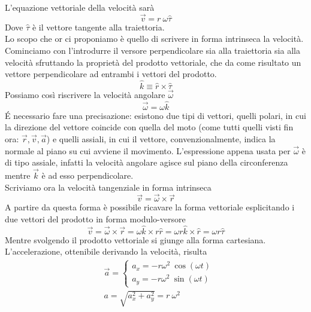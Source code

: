 \documentclass[10pt,a4paper]{article}
\begin{document}
L'equazione vettoriale della velocità  sarà
\begin{equation*}
\vec{v} = r\ \omega \hat{\tau}
\end{equation*}
Dove $\hat{\tau}$ è il vettore tangente alla traiettoria.\\
Lo scopo che or ci proponiamo è quello di scrivere in forma intrinseca la velocità. Cominciamo con l'introdurre il versore perpendicolare sia alla traiettoria sia alla velocità sfruttando la proprietà del prodotto vettoriale, che da come risultato un vettore perpendicolare ad entrambi i vettori del prodotto.
\begin{equation*}
	\hat{k} \equiv \hat{r} \times \hat{\tau}
\end{equation*}
Possiamo così riscrivere la velocità angolare $\vec{\omega}$
\begin{equation*}
	\vec{\omega} = \omega \hat{k}
\end{equation*}
\'{E} necessario fare una precisazione: esistono due tipi di vettori, quelli polari, in cui la direzione del vettore coincide con quella del moto (come tutti quelli visti fin ora: $\vec{r}, \vec{v}, \vec{a}$) e quelli assiali, in cui il vettore, convenzionalmente, indica la normale al piano su cui avviene il movimento. L'espressione appena usata per $\vec{\omega}$ è di tipo assiale, infatti la velocità angolare agisce sul piano della circonferenza mentre $\vec{k}$ è ad esso perpendicolare.\\
Scriviamo ora la velocità tangenziale in forma intrinseca
 \begin{equation*}
 	\vec{v} = \vec{\omega} \times \vec{r}
 \end{equation*}
A partire da questa forma è possibile ricavare la forma vettoriale esplicitando i due vettori del prodotto in forma modulo-versore
 \begin{equation*}
	\vec{v} = \vec{\omega} \times \vec{r} = \omega \hat{k} \times r \hat{r} = \omega r \hat{k} \times \hat{r} = \omega r \hat{\tau}
\end{equation*}
Mentre svolgendo il prodotto vettoriale si giunge alla forma cartesiana. \\
L'accelerazione, ottenibile derivando la velocità, risulta 
\begin{align*}
&\vec{a}=
	\begin{cases}
		a_x = -r \omega^2\ \cos(\omega t)\\
		a_y = -r \omega^2\ \sin(\omega t)
	\end{cases}\\
&a = \sqrt{a_x^2 + a_y^2}= r\ \omega^2
\end{align*}
\end{document}
